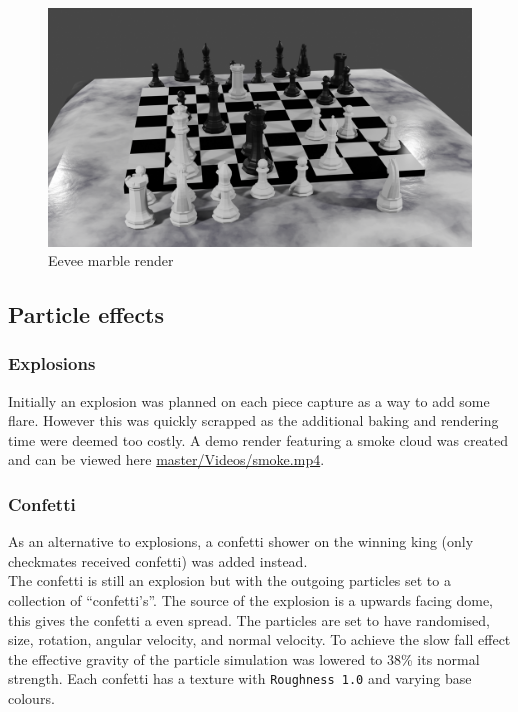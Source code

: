\documentclass[11pt]{article}
\begin{document}
\begin{figure}[htbp]
\centering
\includegraphics[width=\textwidth]{Images/Marble eevee.png}
\caption{Eevee marble render}
\end{figure}
\newpage
\subsection{Particle effects}
\label{sec:orgb851a90}
\subsubsection{Explosions}
\label{sec:org87d3464}
Initially an explosion was planned on each piece capture as a way to add some
flare. However this was quickly scrapped as the additional baking and rendering time
were deemed too costly. A demo render featuring a smoke cloud was created and can
be viewed here \href{https://github.com/Jake-Moss/blender-chess/blob/master/Videos/smoke.mp4}{master/Videos/smoke.mp4}.
\subsubsection{Confetti}
\label{sec:org697762f}
As an alternative to explosions, a confetti shower on the winning king (only
checkmates received confetti) was added instead.\\

The confetti is still an explosion but with the outgoing particles set to a
collection of ``confetti's''. The source of the explosion is a upwards facing
dome, this gives the confetti a even spread. The particles are set to have
randomised, size, rotation, angular velocity, and normal velocity. To achieve the
slow fall effect the effective gravity of the particle simulation was lowered to
38\% its normal strength. Each confetti has a texture with \texttt{Roughness 1.0} and
varying base colours.
\end{document}
